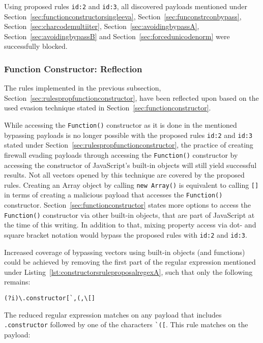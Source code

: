 Using proposed rules \verb|id:2| and \verb|id:3|, all discovered payloads mentioned under Section~\ref{sec:functionconstructorsingleeva}, Section~\ref{sec:funconstrconbypass}, Section~\ref{sec:charcodemultiiter}, Section~\ref{sec:avoidingbypassA}, Section~\ref{sec:avoidingbypassB} and Section~\ref{sec:forcedunicodenorm} were successfully blocked.


\subsubsection{Function Constructor: Reflection}
\label{sec:rulespropfunctionconstructorreflection}
The rules implemented in the previous subsection, Section~\ref{sec:rulespropfunctionconstructor}, have been reflected upon based on the used evasion technique stated in Section~\ref{sec:functionconstructor}.

While accessing the \verb|Function()| constructor as it is done in the mentioned bypassing payloads is no longer possible with the proposed rules \verb|id:2| and \verb|id:3| stated under Section~\ref{sec:rulespropfunctionconstructor}, the practice of creating firewall evading payloads through accessing the \verb|Function()| constructor by accessing the constructor of JavaScript's built-in objects will still yield successful results.
Not all vectors opened by this technique are covered by the proposed rules. Creating an Array object by calling \verb|new Array()| is equivalent to calling \verb|[]| in terms of creating a malicious payload that accesses the \verb|Function()| constructor.
Section~\ref{sec:functionconstructor} states more options to access the \verb|Function()| constructor via other built-in objects, that are part of JavaScript at the time of this writing. In addition to that, mixing property access via dot- and square bracket notation would bypass the proposed rules with \verb|id:2| and \verb|id:3|.

Increased coverage of bypassing vectors using built-in objects (and functions) could be achieved by removing the first part of the regular expression mentioned under Listing~\ref{lst:constructorsruleproposalregexA}, such that only the following remains:

\begin{lstlisting}[style=basicStyle, caption=Reduced regular expression of proposed rule id:2, label={lst:propredregex}]
(?i)\.constructor[`,(,\[]
\end{lstlisting}
The reduced regular expression matches on any payload that includes \verb|.constructor| followed by one of the characters \verb|`([|. This rule matches on the payload:

